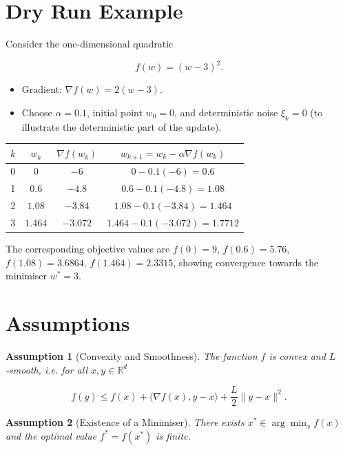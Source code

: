 \documentclass[11pt]{article}
\newtheorem{assumption}{Assumption}
\newcommand{\R}{\mathbb{R}}
\begin{document}
\section*{Dry Run Example}
Consider the one‑dimensional quadratic  

\[
f(w)=(w-3)^{2}.
\]

\begin{itemize}
\item Gradient: $\nabla f(w)=2(w-3)$.
\item Choose $\alpha=0.1$, initial point $w_{0}=0$, and deterministic
noise $\xi_{k}=0$ (to illustrate the deterministic part of the update).
\end{itemize}

\begin{center}
\begin{tabular}{c|c|c|c}
$k$ & $w_{k}$ & $\nabla f(w_{k})$ & $w_{k+1}=w_{k}-\alpha\nabla f(w_{k})$ \\ \hline
0 & $0$ & $-6$ & $0-0.1(-6)=0.6$ \\ 
1 & $0.6$ & $-4.8$ & $0.6-0.1(-4.8)=1.08$ \\ 
2 & $1.08$ & $-3.84$ & $1.08-0.1(-3.84)=1.464$ \\ 
3 & $1.464$ & $-3.072$ & $1.464-0.1(-3.072)=1.7712$ 
\end{tabular}
\end{center}

The corresponding objective values are $f(0)=9$, $f(0.6)=5.76$, $f(1.08)=3.6864$, $f(1.464)=2.3315$, showing convergence towards the minimiser $w^{*}=3$.

\section*{Assumptions}
\begin{assumption}[Convexity and Smoothness]\label{ass:convex}
The function $f$ is convex and $L$‑smooth, i.e. for all $x,y\in\R^{d}$  

\[
f(y)\le f(x)+\langle\nabla f(x),y-x\rangle+\frac{L}{2}\|y-x\|^{2}.
\tag{4}
\]
\end{assumption}

\begin{assumption}[Existence of a Minimiser]\label{ass:opt}
There exists $x^{*}\in\arg\min_{x}f(x)$ and the optimal value $f^{*}=f(x^{*})$ is finite.
\end{assumption}
\end{document}
